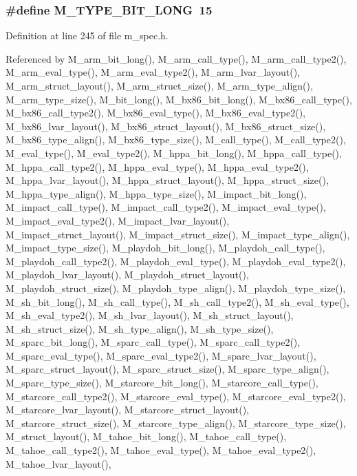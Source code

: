 \subsubsection{\setlength{\rightskip}{0pt plus 5cm}\#define M\_\-TYPE\_\-BIT\_\-LONG~15}\label{m__spec_8h_ddc5d257705334d4c638a99ecc27ca65}




Definition at line 245 of file m\_\-spec.h.

Referenced by M\_\-arm\_\-bit\_\-long(), M\_\-arm\_\-call\_\-type(), M\_\-arm\_\-call\_\-type2(), M\_\-arm\_\-eval\_\-type(), M\_\-arm\_\-eval\_\-type2(), M\_\-arm\_\-lvar\_\-layout(), M\_\-arm\_\-struct\_\-layout(), M\_\-arm\_\-struct\_\-size(), M\_\-arm\_\-type\_\-align(), M\_\-arm\_\-type\_\-size(), M\_\-bit\_\-long(), M\_\-bx86\_\-bit\_\-long(), M\_\-bx86\_\-call\_\-type(), M\_\-bx86\_\-call\_\-type2(), M\_\-bx86\_\-eval\_\-type(), M\_\-bx86\_\-eval\_\-type2(), M\_\-bx86\_\-lvar\_\-layout(), M\_\-bx86\_\-struct\_\-layout(), M\_\-bx86\_\-struct\_\-size(), M\_\-bx86\_\-type\_\-align(), M\_\-bx86\_\-type\_\-size(), M\_\-call\_\-type(), M\_\-call\_\-type2(), M\_\-eval\_\-type(), M\_\-eval\_\-type2(), M\_\-hppa\_\-bit\_\-long(), M\_\-hppa\_\-call\_\-type(), M\_\-hppa\_\-call\_\-type2(), M\_\-hppa\_\-eval\_\-type(), M\_\-hppa\_\-eval\_\-type2(), M\_\-hppa\_\-lvar\_\-layout(), M\_\-hppa\_\-struct\_\-layout(), M\_\-hppa\_\-struct\_\-size(), M\_\-hppa\_\-type\_\-align(), M\_\-hppa\_\-type\_\-size(), M\_\-impact\_\-bit\_\-long(), M\_\-impact\_\-call\_\-type(), M\_\-impact\_\-call\_\-type2(), M\_\-impact\_\-eval\_\-type(), M\_\-impact\_\-eval\_\-type2(), M\_\-impact\_\-lvar\_\-layout(), M\_\-impact\_\-struct\_\-layout(), M\_\-impact\_\-struct\_\-size(), M\_\-impact\_\-type\_\-align(), M\_\-impact\_\-type\_\-size(), M\_\-playdoh\_\-bit\_\-long(), M\_\-playdoh\_\-call\_\-type(), M\_\-playdoh\_\-call\_\-type2(), M\_\-playdoh\_\-eval\_\-type(), M\_\-playdoh\_\-eval\_\-type2(), M\_\-playdoh\_\-lvar\_\-layout(), M\_\-playdoh\_\-struct\_\-layout(), M\_\-playdoh\_\-struct\_\-size(), M\_\-playdoh\_\-type\_\-align(), M\_\-playdoh\_\-type\_\-size(), M\_\-sh\_\-bit\_\-long(), M\_\-sh\_\-call\_\-type(), M\_\-sh\_\-call\_\-type2(), M\_\-sh\_\-eval\_\-type(), M\_\-sh\_\-eval\_\-type2(), M\_\-sh\_\-lvar\_\-layout(), M\_\-sh\_\-struct\_\-layout(), M\_\-sh\_\-struct\_\-size(), M\_\-sh\_\-type\_\-align(), M\_\-sh\_\-type\_\-size(), M\_\-sparc\_\-bit\_\-long(), M\_\-sparc\_\-call\_\-type(), M\_\-sparc\_\-call\_\-type2(), M\_\-sparc\_\-eval\_\-type(), M\_\-sparc\_\-eval\_\-type2(), M\_\-sparc\_\-lvar\_\-layout(), M\_\-sparc\_\-struct\_\-layout(), M\_\-sparc\_\-struct\_\-size(), M\_\-sparc\_\-type\_\-align(), M\_\-sparc\_\-type\_\-size(), M\_\-starcore\_\-bit\_\-long(), M\_\-starcore\_\-call\_\-type(), M\_\-starcore\_\-call\_\-type2(), M\_\-starcore\_\-eval\_\-type(), M\_\-starcore\_\-eval\_\-type2(), M\_\-starcore\_\-lvar\_\-layout(), M\_\-starcore\_\-struct\_\-layout(), M\_\-starcore\_\-struct\_\-size(), M\_\-starcore\_\-type\_\-align(), M\_\-starcore\_\-type\_\-size(), M\_\-struct\_\-layout(), M\_\-tahoe\_\-bit\_\-long(), M\_\-tahoe\_\-call\_\-type(), M\_\-tahoe\_\-call\_\-type2(), M\_\-tahoe\_\-eval\_\-type(), M\_\-tahoe\_\-eval\_\-type2(), M\_\-tahoe\_\-lvar\_\-layout(), 